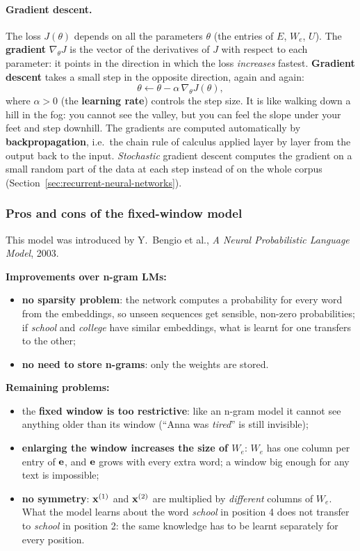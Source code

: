 \paragraph{Gradient descent.}
\notinslides
The loss $J(\theta)$ depends on all the parameters $\theta$ (the entries of $E$, $W_e$,
$U$). The \textbf{gradient} $\nabla_\theta J$ is the vector of the derivatives of $J$
with respect to each parameter: it points in the direction in which the loss
\emph{increases} fastest. \textbf{Gradient descent} takes a small step in the opposite
direction, again and again:
\[
  \theta \leftarrow \theta - \alpha\, \nabla_\theta J(\theta),
\]
where $\alpha > 0$ (the \textbf{learning rate}) controls the step size. It is like
walking down a hill in the fog: you cannot see the valley, but you can feel the slope
under your feet and step downhill. The gradients are computed automatically by
\textbf{backpropagation}, i.e.\ the chain rule of calculus applied layer by layer from
the output back to the input. \emph{Stochastic} gradient descent computes the gradient
on a small random part of the data at each step instead of on the whole corpus
(Section~\ref{sec:recurrent-neural-networks}).

\subsubsection{Pros and cons of the fixed-window model}

This model was introduced by Y.~Bengio et al., \emph{A Neural Probabilistic Language
Model}, 2003.

\textbf{Improvements over n-gram LMs:}
\begin{itemize}[nosep]
  \item \textbf{no sparsity problem}: the network computes a probability for every word
        from the embeddings, so unseen sequences get sensible, non-zero probabilities;
        if \emph{school} and \emph{college} have similar embeddings, what is learnt
        for one transfers to the other;
  \item \textbf{no need to store n-grams}: only the weights are stored.
\end{itemize}

\textbf{Remaining problems:}
\begin{itemize}[nosep]
  \item the \textbf{fixed window is too restrictive}: like an n-gram model it cannot see
        anything older than its window (``Anna was \emph{tired}'' is still invisible);
  \item \textbf{enlarging the window increases the size of $W_e$}: $W_e$ has one column
        per entry of $\mathbf{e}$, and $\mathbf{e}$ grows with every extra word; a window big
        enough for any text is impossible;
  \item \textbf{no symmetry}: $\mathbf{x}^{(1)}$ and $\mathbf{x}^{(2)}$ are multiplied by
        \emph{different} columns of $W_e$. What the model learns about the word
        \emph{school} in position 4 does not transfer to \emph{school} in position 2:
        the same knowledge has to be learnt separately for every position.
\end{itemize}

